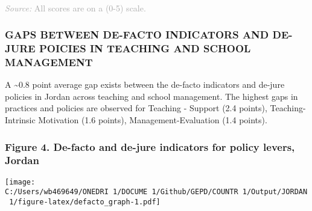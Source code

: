 \documentclass[twocolumn]{article}
\begin{document}
\begin{table}[H]
\\
{\scriptsize
    \textcolor{darkgray}{\textit{Source:} All scores are on a (0-5) scale.}
  }

\end{table}
\raggedbottom

\hypertarget{gaps-between-de-facto-indicators-and-de-jure-poicies-in-teaching-and-school-management}{%
\subsubsection{\texorpdfstring{\textbf{GAPS BETWEEN DE-FACTO INDICATORS
AND DE-JURE POICIES IN TEACHING AND SCHOOL
MANAGEMENT}}{GAPS BETWEEN DE-FACTO INDICATORS AND DE-JURE POICIES IN TEACHING AND SCHOOL MANAGEMENT}}\label{gaps-between-de-facto-indicators-and-de-jure-poicies-in-teaching-and-school-management}}

A \textasciitilde{}0.8 point average gap exists between the de-facto
indicators and de-jure policies in Jordan across teaching and school
management. The highest gaps in practices and policies are observed for
Teaching - Support (2.4 points), Teaching- Intrinsic Motivation (1.6
points), Management-Evaluation (1.4 points).

\hypertarget{figure-4.-de-facto-and-de-jure-indicators-for-policy-levers-jordan}{%
\subsubsection{Figure 4. De-facto and de-jure indicators for policy
levers,
Jordan}\label{figure-4.-de-facto-and-de-jure-indicators-for-policy-levers-jordan}}

\texttt{[image: C:/Users/wb469649/ONEDRI~1/DOCUME~1/Github/GEPD/COUNTR~1/Output/JORDAN~1/figure-latex/defacto\_graph-1.pdf]}
\end{document}
